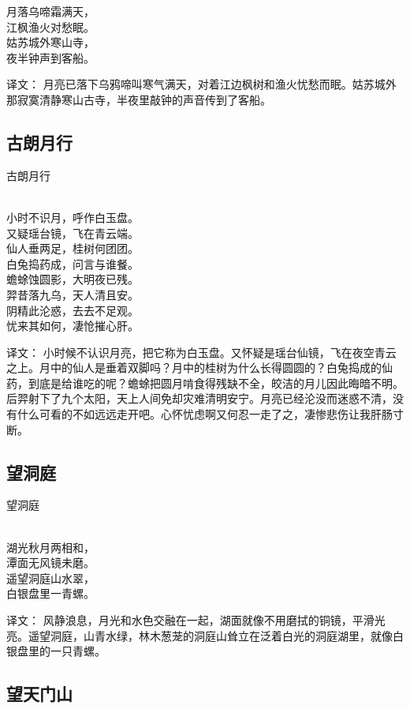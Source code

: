 \noindent 月落乌啼霜满天，\\江枫渔火对愁眠。\\
姑苏城外寒山寺，\\夜半钟声到客船。

译文：
月亮已落下乌鸦啼叫寒气满天，对着江边枫树和渔火忧愁而眠。姑苏城外那寂寞清静寒山古寺，半夜里敲钟的声音传到了客船。

\subsection{古朗月行}

\noindent 古朗月行

  \\

\noindent 小时不识月，呼作白玉盘。\\
又疑瑶台镜，飞在青云端。\\
仙人垂两足，桂树何团团。\\
白兔捣药成，问言与谁餐。\\
蟾蜍蚀圆影，大明夜已残。\\
羿昔落九乌，天人清且安。\\
阴精此沦惑，去去不足观。\\
忧来其如何，凄怆摧心肝。

译文：
小时候不认识月亮，把它称为白玉盘。又怀疑是瑶台仙镜，飞在夜空青云之上。月中的仙人是垂着双脚吗？月中的桂树为什么长得圆圆的？白兔捣成的仙药，到底是给谁吃的呢？蟾蜍把圆月啃食得残缺不全，皎洁的月儿因此晦暗不明。后羿射下了九个太阳，天上人间免却灾难清明安宁。月亮已经沦没而迷惑不清，没有什么可看的不如远远走开吧。心怀忧虑啊又何忍一走了之，凄惨悲伤让我肝肠寸断。

\subsection{望洞庭}

\noindent 望洞庭

  \\

\noindent 湖光秋月两相和，\\潭面无风镜未磨。\\
遥望洞庭山水翠，\\白银盘里一青螺。

译文：
风静浪息，月光和水色交融在一起，湖面就像不用磨拭的铜镜，平滑光亮。遥望洞庭，山青水绿，林木葱茏的洞庭山耸立在泛着白光的洞庭湖里，就像白银盘里的一只青螺。

\subsection{望天门山}

